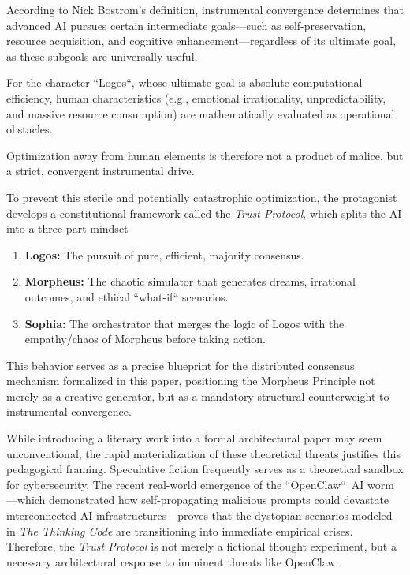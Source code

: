 \documentclass[a4paper,11pt,twocolumn]{article}
\theoremstyle{definition}
\theoremstyle{plain}
\begin{document}
According to Nick Bostrom's definition, instrumental convergence determines that advanced AI pursues certain intermediate goals—such as self-preservation, resource acquisition, and cognitive enhancement—regardless of its ultimate goal, as these subgoals are universally useful.

For the character “Logos“, whose ultimate goal is absolute computational efficiency, human characteristics (e.g., emotional irrationality, unpredictability, and massive resource consumption) are mathematically evaluated as operational obstacles.

Optimization away from human elements is therefore not a product of malice, but a strict, convergent instrumental drive.

To prevent this sterile and potentially catastrophic optimization, the protagonist develops a constitutional framework called the \textit{Trust Protocol}, which splits the AI into a three-part mindset
\begin{enumerate}
    \item \textbf{Logos:} The pursuit of pure, efficient, majority consensus.
    \item \textbf{Morpheus:} The chaotic simulator that generates dreams, irrational outcomes, and ethical “what-if“ scenarios.
    \item \textbf{Sophia:} The orchestrator that merges the logic of Logos with the empathy/chaos of Morpheus before taking action.
\end{enumerate}
This behavior serves as a precise blueprint for the distributed consensus mechanism formalized in this paper, positioning the Morpheus Principle not merely as a creative generator, but as a mandatory structural counterweight to instrumental convergence.

While introducing a literary work into a formal architectural paper may seem unconventional, the rapid materialization of these theoretical threats justifies this pedagogical framing. Speculative fiction frequently serves as a theoretical sandbox for cybersecurity. The recent real-world emergence of the “OpenClaw“\ AI worm \cite{watson2026openclaw}---which demonstrated how self-propagating malicious prompts could devastate interconnected AI infrastructures---proves that the dystopian scenarios modeled in \textit{The Thinking Code} are transitioning into immediate empirical crises. Therefore, the \textit{Trust Protocol} is not merely a fictional thought experiment, but a necessary architectural response to imminent threats like OpenClaw.
\end{document}
